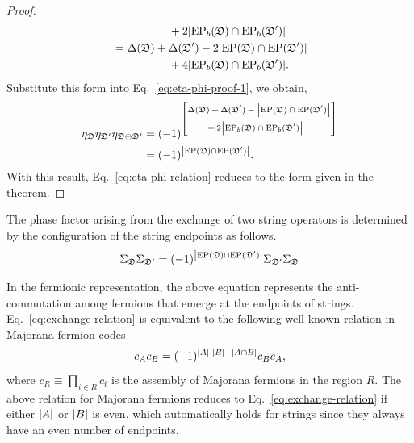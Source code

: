 \begin{proof}
\begin{align*}
          & \hspace{5em} + 2\abs{\mathrm{EP}_b(\mathfrak{D}) \cap \mathrm{EP}_b(\mathfrak{D}')} \\
      &=
      \Delta(\mathfrak{D}) + \Delta(\mathfrak{D}') - 2\abs{\mathrm{EP}(\mathfrak{D}) \cap \mathrm{EP}(\mathfrak{D}')} \\
          & \hspace{5em} + 4\abs{\mathrm{EP}_b(\mathfrak{D}) \cap \mathrm{EP}_b(\mathfrak{D}')}.
  \end{align*}
  Substitute this form into Eq.~\eqref{eq:eta-phi-proof-1}, we obtain,
  \begin{align*}
      \eta_{\mathfrak{D}}\eta_{\mathfrak{D}'}\eta_{\mathfrak{D}\ominus\mathfrak{D}'}
      &=
      (-1)^{
        \left[ 
            \scriptsize
        \begin{aligned}
            &\Delta(\mathfrak{D}) + \Delta(\mathfrak{D}') - 
            \abs{\mathrm{EP}(\mathfrak{D}) \cap \mathrm{EP}(\mathfrak{D}')} \\
            & \qquad  + 2 \abs{\mathrm{EP}_b(\mathfrak{D}) \cap \mathrm{EP}_b(\mathfrak{D}')}
        \end{aligned}
         \right]
      } \\
      &= (-1)^{\abs{\mathrm{EP}(\mathfrak{D}) \cap \mathrm{EP}(\mathfrak{D}')}}.
  \end{align*}
  With this result, Eq.~\eqref{eq:eta-phi-relation} reduces to the form given in the theorem.
\end{proof}
\begin{corollary}
The phase factor arising from the exchange of two string operators is determined by the configuration of the string endpoints as follows.
  \begin{equation}\label{eq:exchange-relation}
      \Sigma_{\mathfrak{D}}\Sigma_{\mathfrak{D}'} = (-1)^{\abs{\mathrm{EP}(\mathfrak{D}) \cap \mathrm{EP}(\mathfrak{D}')}} 
  \Sigma_{\mathfrak{D}'}\Sigma_{\mathfrak{D}}
  \end{equation}
\end{corollary}
In the fermionic representation, the above equation represents the anti-commutation among fermions that emerge at the endpoints of strings. Eq.~\eqref{eq:exchange-relation} is equivalent to the following well-known relation in Majorana fermion codes~\cite{Bravyi_2010_majorana-code}
\[
c_A c_B = (-1)^{\abs{A}\cdot\abs{B} + \abs{A\cap B}}c_Bc_A,
\]
where $c_R \equiv \prod_{i\in R}c_i$ is the assembly of Majorana fermions in the region $R$. The above relation for Majorana fermions reduces to Eq.~\eqref{eq:exchange-relation} if either $\abs{A}$ or $\abs{B}$ is even, which automatically holds for strings since they always have an even number of endpoints.

